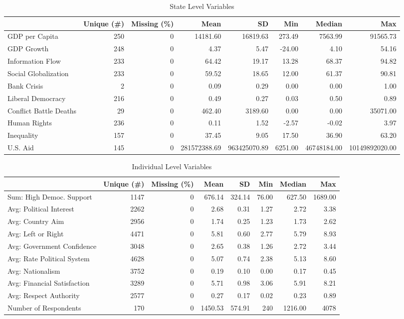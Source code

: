 \documentclass[12pt]{article}
\begin{document}
\begin{table}
\caption{\label{tab:state-vars}State Level Variables}
\centering
\begin{tabular}[t]{lrrrrrrr}
\toprule
  & Unique (\#) & Missing (\%) & Mean & SD & Min & Median & Max\\
\midrule
GDP per Capita & 250 & 0 & 14181.60 & 16819.63 & 273.49 & 7563.99 & 91565.73\\
GDP Growth & 248 & 0 & 4.37 & 5.47 & -24.00 & 4.10 & 54.16\\
Information Flow & 233 & 0 & 64.42 & 19.17 & 13.28 & 68.37 & 94.82\\
Social Globalization & 233 & 0 & 59.52 & 18.65 & 12.00 & 61.37 & 90.81\\
Bank Crisis & 2 & 0 & 0.09 & 0.29 & 0.00 & 0.00 & 1.00\\
Liberal Democracy & 216 & 0 & 0.49 & 0.27 & 0.03 & 0.50 & 0.89\\
Conflict Battle Deaths & 29 & 0 & 462.40 & 3189.60 & 0.00 & 0.00 & 35071.00\\
Human Rights & 236 & 0 & 0.11 & 1.52 & -2.57 & -0.02 & 3.97\\
Inequality & 157 & 0 & 37.45 & 9.05 & 17.50 & 36.90 & 63.20\\
U.S. Aid & 145 & 0 & 281572388.69 & 963425070.89 & 6251.00 & 46748184.00 & 10149892020.00\\
\bottomrule
\end{tabular}
\end{table}



\begin{table}
\caption{\label{tab:wvs-vars}Individual Level Variables}
\centering
\begin{tabular}[t]{lrrrrrrr}
\toprule
  & Unique (\#) & Missing (\%) & Mean & SD & Min & Median & Max\\
\midrule
Sum: High Democ. Support & 1147 & 0 & 676.14 & 324.14 & 76.00 & 627.50 & 1689.00\\
Avg: Political Interest & 2262 & 0 & 2.68 & 0.31 & 1.27 & 2.72 & 3.38\\
Avg: Country Aim & 2956 & 0 & 1.74 & 0.25 & 1.23 & 1.73 & 2.62\\
Avg: Left or Right & 4471 & 0 & 5.81 & 0.60 & 2.77 & 5.79 & 8.93\\
Avg: Government Confidence & 3048 & 0 & 2.65 & 0.38 & 1.26 & 2.72 & 3.44\\
Avg: Rate Political System & 4628 & 0 & 5.07 & 0.74 & 2.38 & 5.13 & 8.60\\
Avg: Nationalism & 3752 & 0 & 0.19 & 0.10 & 0.00 & 0.17 & 0.45\\
Avg: Financial Satisfaction & 3289 & 0 & 5.71 & 0.98 & 3.06 & 5.91 & 8.21\\
Avg: Respect Authority & 2577 & 0 & 0.27 & 0.17 & 0.02 & 0.23 & 0.89\\
Number of Respondents & 170 & 0 & 1450.53 & 574.91 & 240 & 1216.00 & 4078\\
\bottomrule
\end{tabular}
\end{table}
\end{document}

